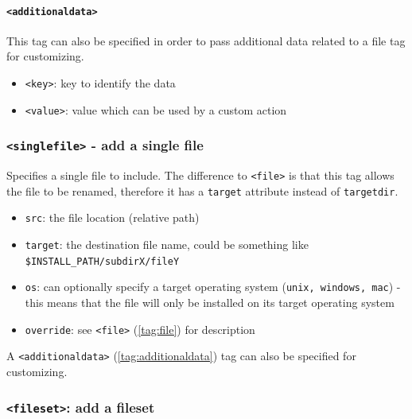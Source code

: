 \paragraph{\label{tag:additionaldata}\texttt{<additionaldata>}}

This tag can also be specified in order to pass additional data
related to a file tag for customizing.

\begin{itemize}

  \item \texttt{<key>}: key to identify the data
  \item \texttt{<value>}: value which can be used by a custom
  action

\end{itemize}

\subsubsection{\label{tag:singlefile}\texttt{<singlefile>} - add a single file}

Specifies a single file to include. The difference to \texttt{<file>} is that
this tag allows the file to be renamed, therefore it has a 
\texttt{target} attribute instead of \texttt{targetdir}.

\begin{itemize}

  \item \texttt{src}: the file location (relative path)

  \item \texttt{target}: the destination file name, could be something
  like \texttt{\$INSTALL\_PATH/subdirX/fileY}

  \item \texttt{os}: can optionally specify a target operating system
  (\texttt{unix, windows, mac}) - this means that the file will only be
  installed on its target operating system

  \item \texttt{override}: see \texttt{<file>} (\ref{tag:file}) for description

\end{itemize}
A \texttt{<additionaldata>} (\ref{tag:additionaldata}) tag can
also be specified for customizing.

\subsubsection{\label{tag:fileset}\texttt{<fileset>}: add a fileset}

